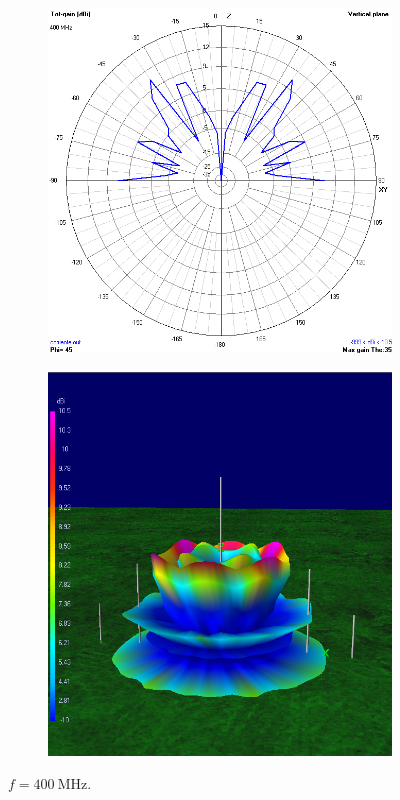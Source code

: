 \begin{figure}[H]
	\begin{subfigure}{0.5\textwidth}
		\includegraphics[scale=0.43]{imagenes/2D_400MHz_tierra.png}
	\end{subfigure}	
	\quad
	\begin{subfigure}{0.5\textwidth}
		\includegraphics[scale=0.43]{imagenes/3D_400MHz_tierra.png}
	\end{subfigure}
	\caption{$f=\SI{400}{\mega\hertz}$.}
	\label{fig.radiacion_400M_tierra}
\end{figure}



